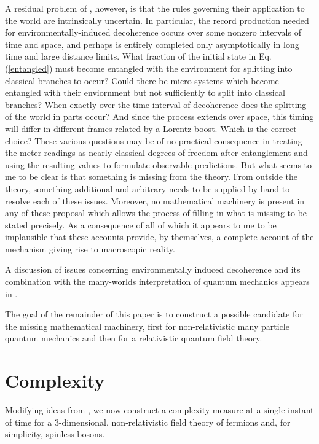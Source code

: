 \documentclass[twocolumn,amsmath,amssymb]{revtex4-1}
\begin{document}
A residual problem of \cite{Zeh, Zurek, Zurek1, Zurek2, Wallace, Riedel}, however, 
is that the rules governing their application to the world are intrinsically uncertain.
In particular, the record production needed for 
environmentally-induced decoherence occurs over some nonzero intervals of time
and space, and perhaps is entirely completed only asymptotically in 
long time and large distance limits.
What fraction of the initial state in Eq. (\ref{entangled})
must become entangled with the environment for splitting into
classical branches to occur?
Could there be micro systems which become entangled with their enviornment but
not sufficiently to split into classical branches?
When exactly over the time interval of decoherence does the splitting of the world in parts 
occur? And since the process extends over space, this timing will differ in different
frames related by a Lorentz boost. Which is the correct choice? 
These various questions may be
of no practical consequence in treating the meter readings as nearly classical
degrees of freedom after entanglement and using the resulting values to formulate observable predictions.
But what seems to me to be clear is that something is missing from the theory. From outside the theory,
something additional and arbitrary needs to be supplied by hand to resolve each of these issues.
Moreover, no mathematical machinery is present in any of these proposal
which allows the process of filling in what is missing to be stated precisely.
As a consequence of all of which it appears to me to be implausible that 
these accounts provide, by themselves, a complete account of
the mechanism giving rise to macroscopic reality.

A discussion of issues concerning environmentally induced decoherence
and its combination with the many-worlds interpretation of quantum mechanics
appears in \cite{Schlosshauer}.

The goal of the remainder of this paper
is to construct a possible candidate for the
missing mathematical machinery, first for non-relativistic 
many particle quantum mechanics and then for a
relativistic quantum field theory.




\section{\label{sec:complexity}Complexity}

Modifying ideas from \cite{Nielsen}, we now construct a complexity measure at a single instant of time
for a 3-dimensional, non-relativistic field theory
of fermions and, for simplicity, spinless bosons.  
\end{document}
